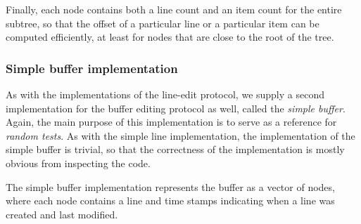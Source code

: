 Finally, each node contains both a line count and an item count for
the entire subtree, so that the offset of a particular line or a
particular item can be computed efficiently, at least for nodes that
are close to the root of the tree.

\subsubsection{Simple buffer implementation}

As with the implementations of the line-edit protocol, we supply a
second implementation for the buffer editing protocol as well, called
the \emph{simple buffer}.  Again, the main purpose of this
implementation is to serve as a reference for \emph{random tests}.  As
with the simple line implementation, the implementation of the simple
buffer is trivial, so that the correctness of the implementation is
mostly obvious from inspecting the code.

The simple buffer implementation represents the buffer as a
\commonlisp{} vector of nodes, where each node contains a line and
time stamps indicating when a line was created and last modified.
